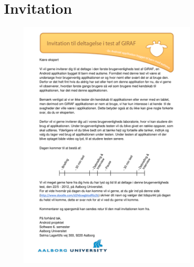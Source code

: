 \section*{Invitation}
\begin{figure}[H]
	\centering
		\includegraphics[width=0.8\textwidth]{input/appendices/invitationToUsability.pdf}
	\label{fig:demot1}
\end{figure}


